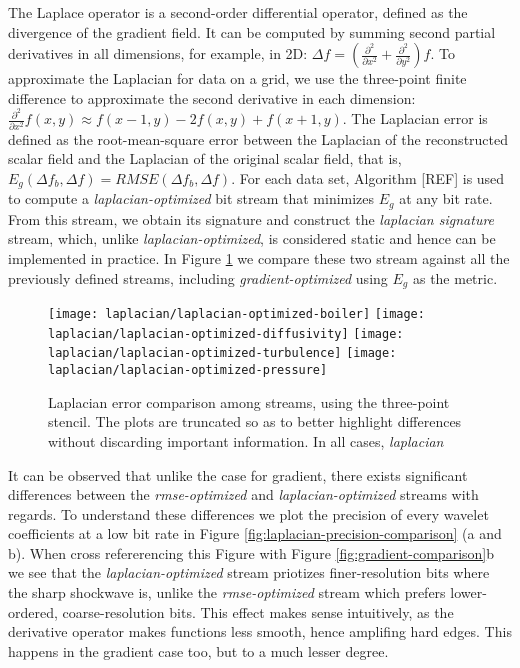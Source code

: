 The Laplace operator is a second-order differential operator, defined as the divergence of the
gradient field. It can be computed by summing second partial derivatives in all dimensions, for
example, in 2D: $\Delta f=(\frac{{\partial}^2}{\partial{x^2}}+\frac{{\partial}^2}{\partial{y^2}})f$.
To approximate the Laplacian for data on a grid, we use the three-point finite difference to
approximate the second derivative in each dimension: $\frac{{\partial}^2}{\partial{x^2}}f(x,y)
\approx f(x-1,y)-2f(x,y)+f(x+1,y)$. The Laplacian error is defined as the root-mean-square error
between the Laplacian of the reconstructed scalar field and the Laplacian of the original scalar
field, that is, $E_g(\Delta f_b,\Delta f)=RMSE(\Delta f_b,\Delta f)$. For each data set, Algorithm
[REF] is used to compute a \emph{laplacian-optimized} bit stream that minimizes $E_g$ at any bit
rate. From this stream, we obtain its signature and construct the \emph{laplacian signature} stream,
which, unlike \emph{laplacian-optimized}, is considered static and hence can be implemented in
practice. In Figure \ref{fig:laplacian-error-comparison} we compare these two stream against all the
previously defined streams, including \emph{gradient-optimized} using $E_g$ as the metric.

\begin{figure}[h]
	\centering
	{\texttt{[image: laplacian/laplacian-optimized-boiler]}}
	{\texttt{[image: laplacian/laplacian-optimized-diffusivity]}}
	{\texttt{[image: laplacian/laplacian-optimized-turbulence]}}
	{\texttt{[image: laplacian/laplacian-optimized-pressure]}}
	\caption{Laplacian error comparison among streams, using the three-point stencil. The plots are
	truncated so as to better highlight differences without discarding important information. In all cases, \emph{laplacian}}
	\label{fig:laplacian-error-comparison}
\end{figure}

It can be observed that unlike the case for gradient, there exists significant differences between
the \emph{rmse-optimized} and \emph{laplacian-optimized} streams with regards. To understand these
differences we plot the precision of every wavelet coefficients at a low bit rate in Figure
\ref{fig:laplacian-precision-comparison} (a and b). When cross refererencing this Figure with Figure
\ref{fig:gradient-comparison}b we see that the \emph{laplacian-optimized} stream priotizes
finer-resolution bits where the sharp shockwave is, unlike the \emph{rmse-optimized} stream which
prefers lower-ordered, coarse-resolution bits. This effect makes sense intuitively, as the
derivative operator makes functions less smooth, hence amplifing hard edges. This happens in the
gradient case too, but to a much lesser degree.

